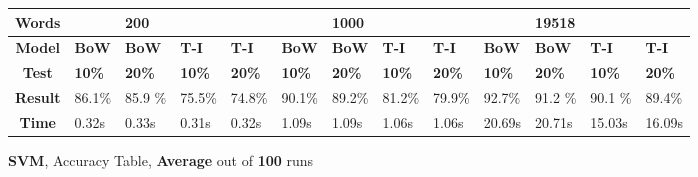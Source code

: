 \documentclass{article}
\begin{document}
	\begin{figure}[H]
		\begin{tabular}{||c||l|l|l|l||l|l|l|l||l|l|l|l||}
			\hline
			\textbf{Words} &  & \textbf{200} & & & &\textbf{1000} & & & & \textbf{19518} &  & \\ \hline 
			\textbf{Model} & \textbf{BoW} & \textbf{BoW} & \textbf{T-I} & \textbf{T-I} &\textbf{BoW} & \textbf{BoW} & \textbf{T-I} & \textbf{T-I} & \textbf{BoW} & \textbf{BoW} & \textbf{T-I} & \textbf{T-I}\\ \hline
			\textbf{Test} & \textbf{10\%} & \textbf{20\%} & \textbf{10\%} & \textbf{20\%} & \textbf{10\%} & \textbf{20\%} & \textbf{10\%} & \textbf{20\%} & \textbf{10\%} & \textbf{20\%} & \textbf{10\%} & \textbf{20\%} \\ \hline \hline  
			\textbf{Result} & 86.1\% &85.9 \% & 75.5\% & 74.8\% &90.1\% &89.2\% &81.2\% & 79.9\% & 92.7\% &91.2 \% &90.1 \% &89.4\% \\ \hline  
			\textbf{Time} &0.32s & 0.33s & 0.31s & 0.32s & 1.09s & 1.09s & 1.06s & 1.06s & 20.69s & 20.71s & 15.03s & 16.09s \\ \hline 
		\end{tabular}
		\caption{\textbf{SVM}, Accuracy Table, \textbf{Average} out of \textbf{100} runs}
	\end{figure}
\end{document}
